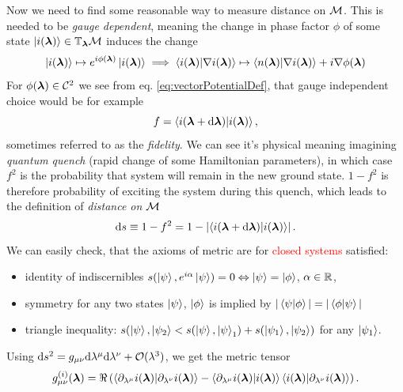 Now we need to find some reasonable way to measure distance on $\mathcal{M}$. This is needed to be \emph{gauge dependent}, meaning the change in phase factor $\phi$ of some state $\ket{i({\bm\lambda})}\in \mathbb{T}_{\bm\lambda}\mathcal{M}$ induces the change 
\begin{equation}
    \ket{i({\bm\lambda})}\mapsto e^{i\phi({\bm\lambda})} \ket{i({\bm\lambda})} \implies \braket{i({\bm\lambda})|\nabla i({\bm\lambda})}\mapsto \braket{n({\bm\lambda})|\nabla i({\bm\lambda})} + i\nabla \phi({\bm\lambda}) 
\end{equation} 
For $\phi({\bm\lambda})\in \mathcal C^2$ we see from eq. \ref{eq:vectorPotentialDef}, that gauge independent choice would be for example
\begin{equation}
    f=\braket{i(\bm{{\bm\lambda}}+\mathrm{d}\bm{{\bm\lambda}})|i(\bm{{\bm\lambda}})},
\end{equation}
sometimes referred to as the \emph{fidelity}. We can see it's physical meaning imagining \emph{quantum quench} (rapid change of some Hamiltonian parameters), in which case $f^2$ is the probability that system will remain in the new ground state. $1-f^2$ is therefore probability of exciting the system during this quench, which leads to the definition of \emph{distance on $\mathcal{M}$}
\begin{equation}
    \mathrm{d} s \equiv 1-f^2= 1-\left|\braket{i(\bm{{\bm\lambda}}+\mathrm{d}\bm{{\bm\lambda}})|i(\bm{{\bm\lambda}})}\right|.
\end{equation}
We can easily check, that the axioms of metric are for \textcolor{red}{closed systems} satisfied:
\begin{itemize}
    \item identity of indiscernibles $s(\ket{\psi},e^{i\alpha}\ket{\psi}) = 0 \Leftrightarrow \ket{\psi}=\ket{\phi}$, $\alpha\in\mathbb{R}$,
    \item symmetry for any two states $\ket{\psi}$, $\ket{\phi}$ is implied by $|\braket{\psi|\phi}|=|\braket{\phi|\psi}|$
    \item triangle inequality: $s(\ket{\psi},\ket{\psi_2} <s(\ket{\psi},\ket{\psi}_1) + s(\ket{\psi_1},\ket{\psi_2})$ for any $\ket{\psi_1}$.
\end{itemize}


Using $\mathrm{d} s^2 = g_{\mu\nu}\mathrm{d} \lambda^\mu \mathrm{d}\lambda^\nu+\mathcal{O}(\lambda^3)$, we get the metric tensor
\begin{equation}
    g_{\mu\nu}^{(i)}(\bm{{\bm\lambda}}) = \Re\left(\braket{\partial_{\lambda^\mu}i(\bm{{\bm\lambda}})|\partial_{\lambda^\nu}i(\bm{{\bm\lambda}})} - \braket{\partial_{\lambda^\mu}i(\bm{{\bm\lambda}})|i(\bm{{\bm\lambda}})}\braket{i(\bm{{\bm\lambda}})|\partial_{\lambda^\nu}i(\bm{{\bm\lambda}})}\right).
    \label{eq:geom.tensorDefinition}
\end{equation}

